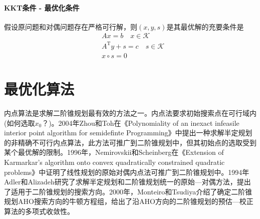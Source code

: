         \paragraph{KKT条件 - 最优化条件}假设原问题和对偶问题存在严格可行解，则$(x,y,s)$是其最优解的充要条件是
        \begin{align*}
           & Ax=b\quad x \in \mathcal{K}\\
           & A^\mathrm{T} y+s=c \quad s \in \mathcal{K}\\
           & x \circ s=0
        \end{align*}
\section{最优化算法}
    \par
    内点算法是求解二阶锥规划最有效的方法之一。内点法要求初始搜索点在可行域内(如何选取$x_0$？)。2004年Zhou和Toh在《Polynomiality of an inexact infeasile interior point algorithm for semidefinte Programming》中提出一种求解半定规划的非精确不可行内点算法，此方法可推广到二阶锥规划中，但其初始点的选取受到某个最优解的限制。1996年，Nemirovskii和Scheinberg在《Extension of Karmarkar's algorithm onto convex quadratically constrained quadratic problems》中证明了线性规划的原始对偶内点法可推广到二阶锥规划中。1994年Adler和Alizadeh研究了求解半定规划和二阶锥规划统一的原始—对偶方法，提出了适用于二阶锥规划的搜索方向。2000年，Monteiro和Tsudiya介绍了确定二阶锥规划AHO搜索方向的牛顿方程组，给出了沿AHO方向的二阶锥规划的预估—校正算法的多项式收敛性。
